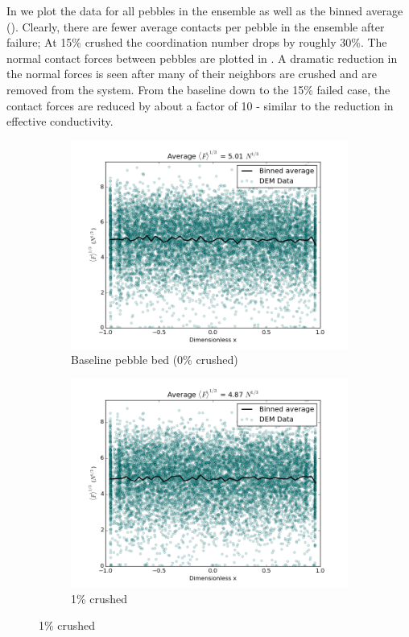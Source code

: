 In  we plot the data for all pebbles in the ensemble as well as the binned average (). Clearly, there are fewer average contacts per pebble in the ensemble after failure; At 15\% crushed the coordination number drops by roughly 30\%. The normal contact forces between pebbles are plotted in . A dramatic reduction in the normal forces is seen after many of their neighbors are crushed and are removed from the system. From the baseline down to the 15\% failed case, the contact forces are reduced by about a factor of 10 - similar to the reduction in effective conductivity.


\begin{figure}[!ht]
    \centering
    \begin{subfigure}[b]{0.4\textwidth}
        \centering
        \includegraphics[width=\textwidth]{figures/heating_dte-02/0/dump/force-profile.png}
        \caption{Baseline pebble bed (0\% crushed)}
    \end{subfigure}
    \begin{subfigure}[b]{0.4\textwidth}
        \centering
        \includegraphics[width=\textwidth]{figures/heating_dte-02/1/dump/force-profile.png}
        \caption{1\% crushed}
    \end{subfigure}
    

\end{figure}
